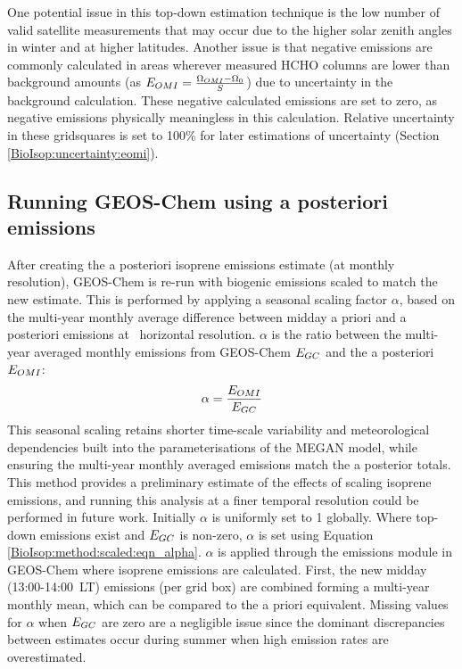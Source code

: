     
    One potential issue in this top-down estimation technique is the low number of valid satellite measurements that may occur due to the higher solar zenith angles in winter and at higher latitudes.
    Another issue is that negative emissions are commonly calculated in areas wherever measured HCHO columns are lower than background amounts (as $E_{OMI} = \frac{\Omega_{OMI} - \Omega_0}{S}$) due to uncertainty in the background calculation.
    These negative calculated emissions are set to zero, as negative emissions physically meaningless in this calculation.
    Relative uncertainty in these gridsquares is set to 100\% for later estimations of uncertainty (Section \ref{BioIsop:uncertainty:eomi}).
    
  
    
  \subsection{Running GEOS-Chem using a posteriori emissions}
  \label{BioIsop:method:scaled}
    
    After creating the a posteriori isoprene emissions estimate (at monthly resolution), GEOS-Chem is re-run with biogenic emissions scaled to match the new estimate. 
    This is performed by applying a seasonal scaling factor $\alpha$, based on the multi-year monthly average difference between midday a priori and a posteriori emissions at \lowhr ~horizontal resolution.
    $\alpha$ is the ratio between the multi-year averaged monthly emissions from GEOS-Chem $E_{GC}$ and the a posteriori $E_{OMI}$: 
    \begin{equation} \label{BioIsop:method:scaled:eqn_alpha}
        \alpha = \frac{E_{OMI}}{E_{GC}}
    \end{equation}
    This seasonal scaling retains shorter time-scale variability and meteorological dependencies built into the parameterisations of the MEGAN model, while ensuring the multi-year monthly averaged emissions match the a posterior totals.
    This method provides a preliminary estimate of the effects of scaling isoprene emissions, and running this analysis at a finer temporal resolution could be performed in future work.
    Initially $\alpha$ is uniformly set to 1 globally.
    Where top-down emissions exist and $E_{GC}$ is non-zero, $\alpha$ is set using Equation \ref{BioIsop:method:scaled:eqn_alpha}.
    $\alpha$ is applied through the emissions module in GEOS-Chem where isoprene emissions are calculated.
    First, the new midday (13:00-14:00~LT) emissions (per grid box) are combined forming a multi-year monthly mean, which can be compared to the a priori equivalent.
    Missing values for $\alpha$ when $E_{GC}$ are zero are a negligible issue since the dominant discrepancies between estimates occur during summer when high emission rates are overestimated.
    

